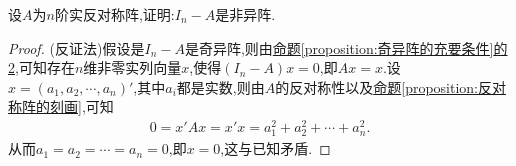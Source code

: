 \documentclass[../../main.tex]{subfiles}%
\begin{document}
\begin{example}
设\(A\)为\(n\)阶实反对称阵,证明:\(I_n - A\)是非异阵.
\end{example}
\begin{proof}
(反证法)假设是$I_n-A$是奇异阵,则由\hyperref[proposition:奇异阵的充要条件2]{命题\ref{proposition:奇异阵的充要条件}的2},可知存在\(n\)维非零实列向量\(x\),使得\((I_n - A)x = 0\),即\(Ax = x\).设\(x = (a_1,a_2,\cdots,a_n)'\),其中\(a_i\)都是实数,则由\(A\)的反对称性以及\hyperref[proposition:反对称阵的刻画]{命题\ref{proposition:反对称阵的刻画}},可知
\begin{align*}
0 = x'Ax = x'x = a_1^2 + a_2^2 + \cdots + a_n^2.
\end{align*}
从而\(a_1 = a_2 = \cdots = a_n = 0\),即\(x = 0\),这与已知矛盾.
\end{proof}
\end{document}
